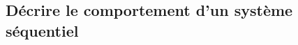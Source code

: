 \subsection{Décrire le comportement d'un système séquentiel}

\renewcommand{\repExo}{../../ExercicesCompetences/B2_ProposerModele/B2_17_Sequentiel}

\renewcommand{\td}{50_BancBalafre}
\graphicspath{{\repStyle/png/}{\repExo/\td/images/}}

